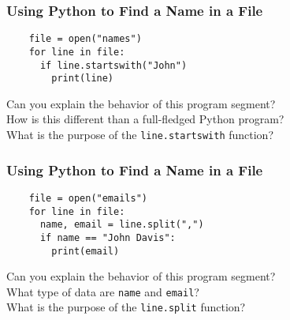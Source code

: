 \documentclass[14pt,aspectratio=169]{beamer}
\begin{document}
%
\begin{frame}[fragile]
  \frametitle{Using Python to Find a Name in a File}
  \normalsize
  \hspace*{-.65in}
  \begin{minipage}{6in}
    \vspace*{.25in}
    \begin{verbatim}
    file = open("names")
    for line in file:
      if line.startswith("John")
        print(line)
    \end{verbatim}
  \end{minipage}
  \vspace*{.25in}
  \begin{center}
    \normalsize \noindent Can you explain the behavior of this program segment? \\
    \normalsize \noindent How is this different than a full-fledged Python program? \\
    \normalsize \noindent What is the purpose of the {\tt line.startswith} function? \\
  \end{center}
\end{frame}

%
\begin{frame}[fragile]
  \frametitle{Using Python to Find a Name in a File}
  \normalsize
  \hspace*{-.65in}
  \begin{minipage}{6in}
    \vspace*{.25in}
    \begin{verbatim}
    file = open("emails")
    for line in file:
      name, email = line.split(",")
      if name == "John Davis":
        print(email)
    \end{verbatim}
  \end{minipage}
  \vspace*{.25in}
  \begin{center}
    \normalsize \noindent Can you explain the behavior of this program segment? \\
    \normalsize \noindent What type of data are {\tt name} and {\tt email}? \\
    \normalsize \noindent What is the purpose of the {\tt line.split} function? \\
  \end{center}
\end{frame}
\end{document}
